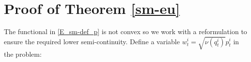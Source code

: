 \documentclass[runningheads]{llncs}
\newcommand{\mdiv}{\text{div}}
\begin{document}
\appendix

\section{Proof of Theorem \ref{sm-eu}}\label{app:proof:sm-eu}
The functional in \eqref{E_sm-def_p} is not convex so we work with a
reformulation to ensure the required lower semi-continuity. Define a
variable $w^i_t = \sqrt{\nu(q_t^i)} p^i_t$ in the problem:
\end{document}
